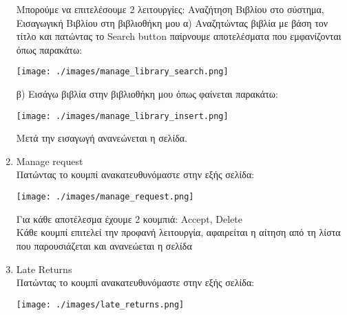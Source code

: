 \documentclass[14pt]{report}
\begin{document}
\begin{enumerate}
		Μπορούμε να επιτελέσουμε 2 λειτουργίες: Αναζήτηση Βιβλίου στο σύστημα, Εισαγωγική Βιβλίου στη βιβλιοθήκη μου
		\newpage
		α) Αναζητώντας βιβλία με βάση τον τίτλο και πατώντας το Search button παίρνουμε αποτελέσματα που εμφανίζονται όπως παρακάτω: \\
		
		\vspace{\baselineskip}
		
		\texttt{[image: ./images/manage\_library\_search.png]}
		
		\vspace{\baselineskip}
		
		\newpage
		β) Εισάγω βιβλία στην βιβλιοθήκη μου όπως φαίνεται παρακάτω: \\
		
		\vspace{\baselineskip}
		
		\texttt{[image: ./images/manage\_library\_insert.png]}
		
		\vspace{\baselineskip}
		
		Μετά την εισαγωγή ανανεώνεται η σελίδα.
		
		\newpage
		\hypertarget{o-manage-request}{}
		\item Manage request \\
		Πατώντας το κουμπί ανακατευθυνόμαστε στην εξής σελίδα: \\
		
		\vspace{\baselineskip}
		
		\texttt{[image: ./images/manage\_request.png]}
		
		\vspace{\baselineskip}
		
		Για κάθε αποτέλεσμα έχουμε 2 κουμπιά: Accept, Delete \\
		Κάθε κουμπί επιτελεί την προφανή λειτουργία, αφαιρείται η αίτηση από τη λίστα που παρουσιάζεται και ανανεώεται η σελίδα \\
		
		\newpage
		\hypertarget{o-late-returns}{}
		\item Late Returns \\
		Πατώντας το κουμπί ανακατευθυνόμαστε στην εξής σελίδα: \\
		
		\vspace{\baselineskip}
		
		\texttt{[image: ./images/late\_returns.png]}
		

\end{enumerate}
\end{document}
